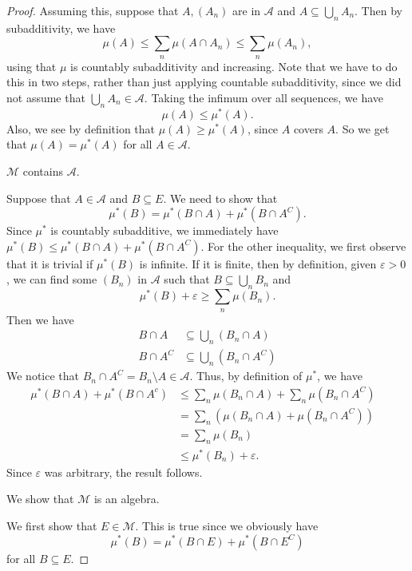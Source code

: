 \documentclass[a4paper]{article}
\begin{document}
\begin{proof}
  Assuming this, suppose that $A, (A_n)$ are in $\mathcal{A}$ and $A \subseteq \bigcup_n A_n$. Then by subadditivity, we have
  \[
    \mu(A) \leq \sum_n \mu(A \cap A_n) \leq \sum_n \mu(A_n),
  \]
  using that $\mu$ is countably subadditivity and increasing. Note that we have to do this in two steps, rather than just applying countable subadditivity, since we did not assume that $\bigcup_n A_n \in \mathcal{A}$. Taking the infimum over all sequences, we have
  \[
    \mu(A) \leq \mu^*(A).
  \]
  Also, we see by definition that $\mu(A) \geq \mu^*(A)$, since $A$ covers $A$. So we get that $\mu(A) = \mu^*(A)$ for all $A \in \mathcal{A}$.

  \begin{claim}
    $\mathcal{M}$ contains $\mathcal{A}$.
  \end{claim}
  Suppose that $A \in \mathcal{A}$ and $B \subseteq E$. We need to show that
  \[
    \mu^*(B) = \mu^*(B \cap A) + \mu^*(B \cap A^C).
  \]
  Since $\mu^*$ is countably subadditive, we immediately have $\mu^*(B) \leq \mu^*(B \cap A) + \mu^*(B \cap A^C)$. For the other inequality, we first observe that it is trivial if $\mu^*(B)$ is infinite. If it is finite, then by definition, given $\varepsilon > 0$, we can find some $(B_n)$ in $\mathcal{A}$ such that $B \subseteq \bigcup_n B_n$ and
  \[
    \mu^*(B) + \varepsilon \geq \sum_n \mu(B_n).
  \]
  Then we have
  \begin{align*}
    B \cap A &\subseteq \bigcup_n (B_n \cap A)\\
    B \cap A^C &\subseteq \bigcup_n (B_n \cap A^C)
  \end{align*}
  We notice that $B_n \cap A^C = B_n \setminus A \in \mathcal{A}$. Thus, by definition of $\mu^*$, we have
  \begin{align*}
    \mu^* (B \cap A) + \mu^*(B \cap A^c) &\leq \sum_n \mu(B_n \cap A) + \sum_n \mu(B_n \cap A^C)\\
    &= \sum_n (\mu(B_n \cap A) + \mu(B_n \cap A^C))\\
    &= \sum_n \mu(B_n) &\\
    &\leq \mu^*(B_n) + \varepsilon.
  \end{align*}
  Since $\varepsilon$ was arbitrary, the result follows.

  \begin{claim}
    We show that $\mathcal{M}$ is an algebra.
  \end{claim}
  We first show that $E \in \mathcal{M}$. This is true since we obviously have
  \[
    \mu^*(B) = \mu^*(B \cap E) + \mu^*(B \cap E^C)
  \]
  for all $B \subseteq E$.


\end{proof}
\end{document}
